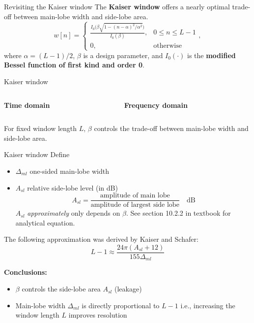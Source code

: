 \documentclass[10pt]{beamer}
\begin{document}
%
\begin{frame}{Revisiting the Kaiser window}
	The \textbf{Kaiser window} offers a nearly optimal trade-off between main-lobe width and side-lobe area.
	\begin{equation*}
	w[n] = \begin{cases}
	\displaystyle\frac{I_0\Big(\beta\sqrt{1- (n-\alpha)^2/\alpha^2}\Big)}{I_0(\beta)}, & 0 \leq n \leq L-1 \\
	0, & \text{otherwise}
	\end{cases},
	\end{equation*}
	where $\alpha = (L-1)/2$, $\beta$ is a design parameter, and $I_0(\cdot)$ is the \textbf{modified Bessel function of first kind and order 0}.
\end{frame}

%
\begin{frame}{Kaiser window}
\begin{columns}[t]
	\begin{column}{0.5\textwidth}
		\textbf{Time domain}
		\begin{center}
			\resizebox{\textwidth}{!}{}
		\end{center}
	\end{column}
	\begin{column}{0.5\textwidth}
		\textbf{Frequency domain}
		\begin{center}
			\resizebox{\textwidth}{!}{}
		\end{center}
	\end{column}
\end{columns}
For fixed window length $L$, $\beta$ controls the trade-off between main-lobe width and side-lobe area.
\end{frame}

%
\begin{frame}{Kaiser window}
Define
\begin{itemize}
	\item $\Delta_{ml}$ one-sided main-lobe width
	\item $A_{sl}$ relative side-lobe level (in dB)
	\begin{equation*}
		A_{sl} = \frac{\text{amplitude of main lobe}}{\text{amplitude of largest side lobe}}\quad\text{dB}
	\end{equation*} 
	$A_{sl}$ \textit{approximately} only depends on $\beta$. See section 10.2.2 in textbook for analytical equation.
\end{itemize}

The following approximation was derived by Kaiser and Schafer:
\begin{equation*}
	L - 1 \approx \frac{24\pi(A_{sl}+12)}{155\Delta_{ml}}
\end{equation*}

\textbf{Conclusions:}
\begin{itemize}
	\item $\beta$ controls the side-lobe area $A_{sl}$ (leakage)
	\item Main-lobe width $\Delta_{ml}$ is directly proportional to $L-1$ i.e., increasing the window length $L$ improves resolution
\end{itemize}
\end{frame}
\end{document}
